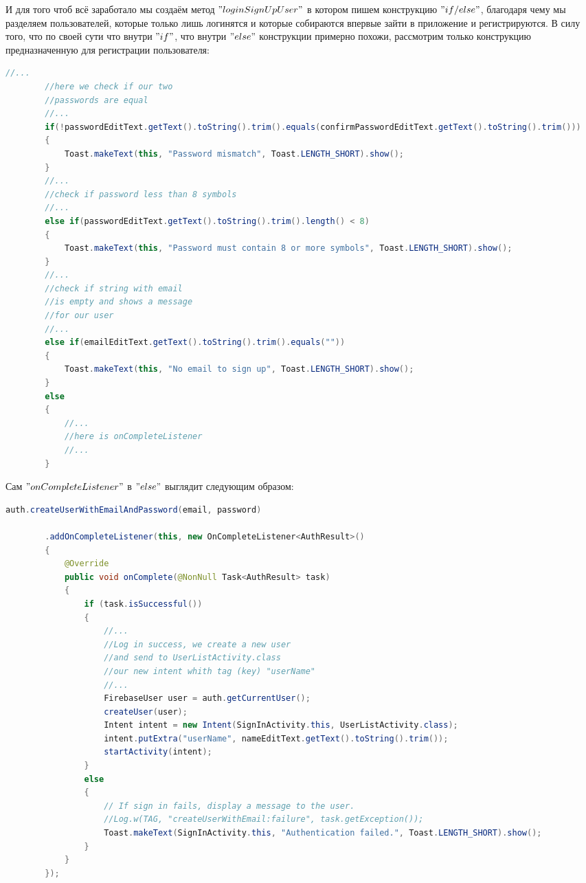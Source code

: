 \documentclass[utf8,14pt,a4paper,oneside,russian]{book}
\begin{document}
	И для того чтоб всё заработало мы создаём метод $"loginSignUpUser"$ в котором пишем конструкцию $"if/else"$, благодаря чему мы разделяем пользователей, которые только лишь логинятся и которые собираются впервые зайти в приложение и регистрируются. В силу того, что по своей сути что внутри $"if"$, что внутри $"else"$ конструкции примерно похожи, рассмотрим только конструкцию предназначенную для регистрации пользователя:	
	
	\begin{lstlisting}[language=Java]
		//...
		//here we check if our two 
		//passwords are equal
		//...
		if(!passwordEditText.getText().toString().trim().equals(confirmPasswordEditText.getText().toString().trim())) 
		{
			Toast.makeText(this, "Password mismatch", Toast.LENGTH_SHORT).show();
		}
		//...
		//check if password less than 8 symbols
		//... 
		else if(passwordEditText.getText().toString().trim().length() < 8) 
		{
			Toast.makeText(this, "Password must contain 8 or more symbols", Toast.LENGTH_SHORT).show();
		}
		//...
		//check if string with email
		//is empty and shows a message
		//for our user
		//...
		else if(emailEditText.getText().toString().trim().equals("")) 
		{
			Toast.makeText(this, "No email to sign up", Toast.LENGTH_SHORT).show();
		} 
		else 
		{				
			//...
			//here is onCompleteListener
			//...
		}
	\end{lstlisting}
	
	Сам $"onCompleteListener"$ в $"else"$ выглядит следующим образом:
	
	\begin{lstlisting}[language=Java]
		auth.createUserWithEmailAndPassword(email, password)
		
		.addOnCompleteListener(this, new OnCompleteListener<AuthResult>() 
		{
			@Override
			public void onComplete(@NonNull Task<AuthResult> task) 
			{
				if (task.isSuccessful()) 
				{
					//...
					//Log in success, we create a new user
					//and send to UserListActivity.class
					//our new intent whith tag (key) "userName"
					//...
					FirebaseUser user = auth.getCurrentUser();
					createUser(user);
					Intent intent = new Intent(SignInActivity.this, UserListActivity.class);
					intent.putExtra("userName", nameEditText.getText().toString().trim());
					startActivity(intent);
				} 
				else 
				{
					// If sign in fails, display a message to the user.
					//Log.w(TAG, "createUserWithEmail:failure", task.getException());
					Toast.makeText(SignInActivity.this, "Authentication failed.", Toast.LENGTH_SHORT).show();
				}
			}
		});
	\end{lstlisting}
	
\end{document}
